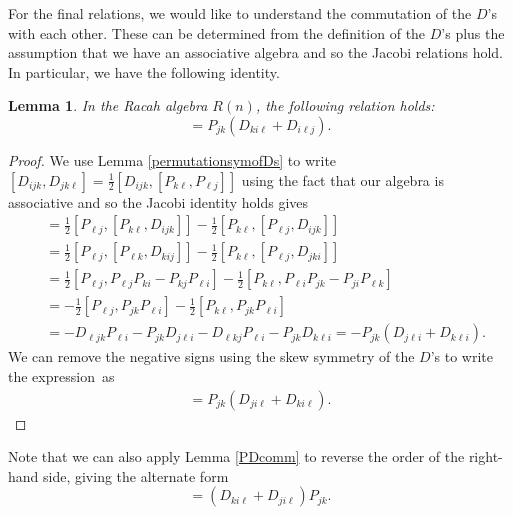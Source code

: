 \documentclass[pdftex]{sigma}
\numberwithin{equation}{section}
\newtheorem{Lemma}[Theorem]{Lemma}
\begin{document}
For the final relations, we would like to understand the commutation of the $D$'s with each other. These can be determined from the definition of the $D$'s plus the assumption that we have an associative algebra and so the Jacobi relations hold. In particular, we have the following identity.

\begin{Lemma} \label{DDlemma}
In the Racah algebra $R(n)$, the following relation holds:
\begin{equation}
[D_{ijk}, D_{jk\ell}] = P_{jk}\left(D_{ki\ell} +D_{i\ell j}\right).\label{DD}
\end{equation}
\end{Lemma}
\begin{proof}
 We use Lemma \ref{permutationsymofDs} to write
$ [D_{ijk}, D_{jk\ell}] =\frac12 [D_{ijk}, [ P_{k\ell}, P_{\ell j}]]$
using the fact that our algebra is associative and so the Jacobi identity holds gives
\begin{align*}
 [D_{ijk}, D_{jk\ell}] &= \tfrac12[ P_{\ell j}, [P_{k\ell}, D_{ijk}]]- \tfrac12[P_{k\ell}, [ P_{\ell j}, D_{ijk}]] \\
&= \tfrac12 [ P_{\ell j}, [P_{\ell k }, D_{kij}]]-\tfrac12 [P_{k\ell}, [ P_{\ell j}, D_{jki}]] \\
&= \tfrac12[ P_{\ell j}, P_{\ell j} P_{ki} -P_{kj}P_{\ell i}] - \tfrac12 [P_{k\ell}, P_{\ell i}P_{jk}- P_{j i}P_{\ell k}]\\
&= -\tfrac12[ P_{\ell j}, P_{jk}P_{\ell i}] - \frac12 [P_{k\ell}, P_{jk}P_{\ell i}] \\
&= -D_{\ell j k}P_{\ell i}- P_{jk} D_{j \ell i} - D_{\ell k j} P_{\ell i} -P_{jk} D_{k \ell i}
= -P_{jk} ( D_{j \ell i} +D_{k\ell i}).
\end{align*}
We can remove the negative signs using the skew symmetry of the $D$'s to write the expression~as
\begin{gather*}
[D_{ijk}, D_{jk\ell}] = P_{jk}\left( D_{ji\ell} +D_{k i\ell }\right).%
\tag*{\qed}
\end{gather*} \renewcommand{\qed}{}
\end{proof}

Note that we can also apply Lemma \ref{PDcomm} to reverse the order of the right-hand side, giving the alternate form
\begin{equation}
[D_{ijk}, D_{jk\ell}] = \left(D_{ki\ell} +D_{ji\ell }\right)P_{jk}. \label{DDop}
\end{equation}
\end{document}
